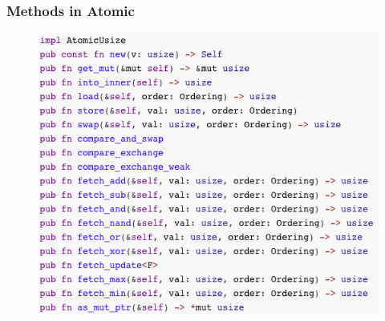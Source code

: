 \begin{frame}[fragile]
    \frametitle{Methods in Atomic}
    \begin{figure}
    \includegraphics[width=0.55\linewidth]{figs/methods-atomic.png}
    \end{figure}

\end{frame}
% 
% 
% 
